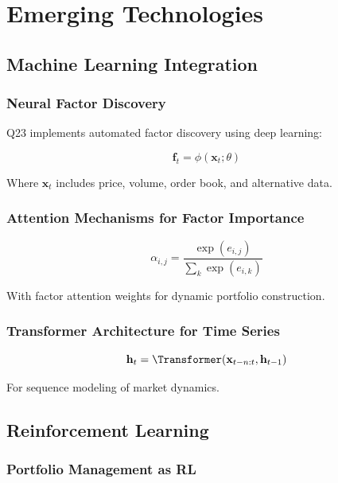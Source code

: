 \documentclass[11pt,letterpaper]{book}
\begin{document}
\section{Emerging Technologies}

\subsection{Machine Learning Integration}

\subsubsection{Neural Factor Discovery}

Q23 implements automated factor discovery using deep learning:

\begin{equation}
\mathbf{f}_t = \phi(\mathbf{x}_t; \theta)
\end{equation}

Where $\mathbf{x}_t$ includes price, volume, order book, and alternative data.

\subsubsection{Attention Mechanisms for Factor Importance}

\begin{equation}
\alpha_{i,j} = \frac{\exp(e_{i,j})}{\sum_k \exp(e_{i,k})}
\end{equation}

With factor attention weights for dynamic portfolio construction.

\subsubsection{Transformer Architecture for Time Series}

\begin{equation}
\mathbf{h}_t = \Transformer(\mathbf{x}_{t-n:t}, \mathbf{h}_{t-1})
\end{equation}

For sequence modeling of market dynamics.

\subsection{Reinforcement Learning}

\subsubsection{Portfolio Management as RL}
\end{document}
